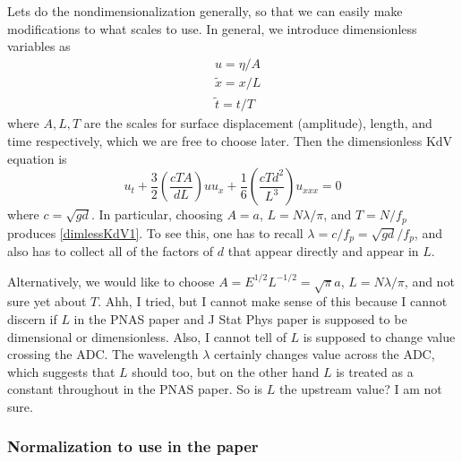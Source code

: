 \documentclass[11pt]{article}
\newcommand{\freqp}{f_p}
\newcommand{\amp}{a}
\newcommand{\ampscale}{A}
\newcommand{\depth}{d}
\newcommand{\lam}{\lambda}
\newcommand{\lamfac}{N}
\newcommand{\drat}{D}
\begin{document}
Lets do the nondimensionalization generally, so that we can easily make modifications to what scales to use. In general, we introduce dimensionless variables as
\begin{align}
&u = \eta / \ampscale \\
&\tilde{x} = x / L \\
&\tilde{t} = t / T
\end{align}
where $\ampscale, L, T$ are the scales for surface displacement (amplitude), length, and time respectively, which we are free to choose later. Then the dimensionless KdV equation is
\begin{equation}
u_t + \frac{3}{2} \left( \frac{c T \ampscale}{\depth L} \right) u u_x 
+ \frac{1}{6} \left( \frac{c T \depth^2}{L^3} \right) u_{xxx} = 0
\end{equation}
where $c = \sqrt{g \depth}$.
In particular, choosing $\ampscale = \amp$, $L = \lamfac \lam/\pi$, and $T = \lamfac/\freqp$ produces \eqref{dimlessKdV1}. To see this, one has to recall $\lam = c/\freqp = \sqrt{g \depth}/\freqp$, and also has to collect all of the factors of $\depth$ that appear directly and appear in $L$.

Alternatively, we would like to choose $\ampscale = E^{1/2} L^{-1/2} = \sqrt{\pi} \amp$, $L = \lamfac \lam/ \pi$, and not sure yet about $T$. Ahh, I tried, but I cannot make sense of this because I cannot discern if $L$ in the PNAS paper and J Stat Phys paper is supposed to be dimensional or dimensionless. Also, I cannot tell of $L$ is supposed to change value crossing the ADC. The wavelength $\lam$ certainly changes value across the ADC, which suggests that $L$ should too, but on the other hand $L$ is treated as a constant throughout in the PNAS paper. So is $L$ the upstream value? I am not sure.


\subsubsection{Normalization to use in the paper}
\end{document}
